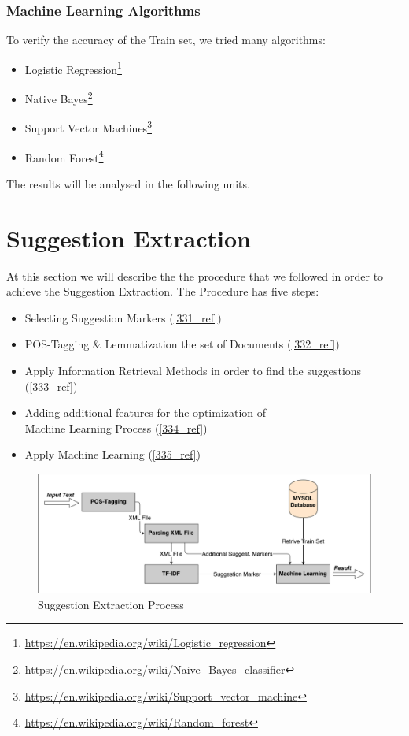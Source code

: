 \subsubsection{Machine Learning Algorithms}\label{3233_ref}
To verify the accuracy of the Train set, we tried many algorithms:\\

\begin{itemize}

	\item Logistic Regression\footnote{\url{https://en.wikipedia.org/wiki/Logistic_regression}}
	\item Native Bayes\footnote{\url{https://en.wikipedia.org/wiki/Naive_Bayes_classifier}}
	\item Support Vector Machines\footnote{\url{https://en.wikipedia.org/wiki/Support_vector_machine}}
	\item Random Forest\footnote{\url{https://en.wikipedia.org/wiki/Random_forest}}\\

\end{itemize}
The results will be analysed in the following units.

\section{Suggestion Extraction}\label{33_ref}
At this section we will describe the the procedure that we followed in order to achieve the Suggestion Extraction. The Procedure has five steps:\\
\begin{itemize}

	\item Selecting Suggestion Markers (\ref{331_ref})
	\item POS-Tagging \& Lemmatization the set of Documents (\ref{332_ref})
	\item Apply Information Retrieval Methods in order to find the suggestions (\ref{333_ref}) 
	\item Adding additional features for the optimization of\\Machine Learning Process (\ref{334_ref})
	\item Apply Machine Learning (\ref{335_ref})\\

\end{itemize}

\begin{figure}[H]
\centering
\includegraphics[width=1\linewidth]{figure/methods/suggestion_extraction.pdf}
\caption{Suggestion Extraction Process}
\end{figure}

